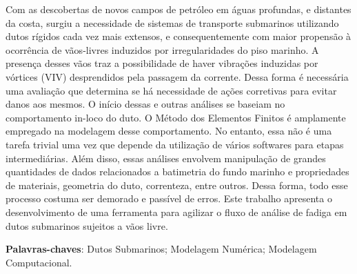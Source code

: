 
\setlength{\absparsep}{18pt} %
\begin{resumo}

    Com as descobertas de novos campos de petróleo em águas profundas, e distantes da costa, surgiu a necessidade de sistemas de transporte submarinos utilizando dutos rígidos cada vez mais extensos, e consequentemente com maior propensão à ocorrência de vãos-livres induzidos por irregularidades do piso marinho.
    A presença desses vãos traz a possibilidade de haver vibrações induzidas por vórtices (VIV) desprendidos pela passagem da corrente.
    Dessa forma é necessária uma avaliação que determina se há necessidade de ações corretivas para evitar danos aos mesmos.
    O início dessas e outras análises se baseiam no comportamento in-loco do duto.
    O Método dos Elementos Finitos é amplamente empregado na modelagem desse comportamento.
    No entanto, essa não é uma tarefa trivial uma vez que depende da utilização de vários softwares para etapas intermediárias.
    Além disso, essas análises envolvem manipulação de grandes quantidades de dados relacionados a batimetria do fundo marinho e propriedades de materiais, geometria do duto, correnteza, entre outros.
    Dessa forma, todo esse processo costuma ser demorado e passível de erros.
    Este trabalho apresenta o desenvolvimento de uma ferramenta para agilizar o fluxo de análise de fadiga em dutos submarinos sujeitos a vãos livre.
    

 \textbf{Palavras-chaves}: Dutos Submarinos; Modelagem Numérica; Modelagem Computacional.
\end{resumo}

